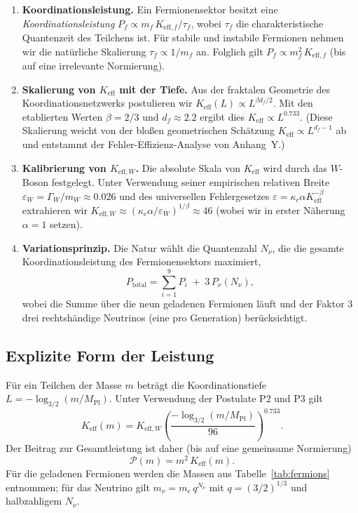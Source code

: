\documentclass[12pt,a4paper]{article}
\begin{document}
	\begin{enumerate}[label=\textbf{P\arabic*}:, leftmargin=*]
		\item \textbf{Koordinationsleistung.} Ein Fermionensektor besitzt eine \emph{Koordinationsleistung} 
		\(P_f \propto m_f \, K_{\mathrm{eff},f}/\tau_f\), wobei \(\tau_f\) die charakteristische Quantenzeit des Teilchens ist.  Für stabile und instabile Fermionen nehmen wir die natürliche Skalierung \(\tau_f \propto 1/m_f\) an.  Folglich gilt \(P_f \propto m_f^2 \, K_{\mathrm{eff},f}\) (bis auf eine irrelevante Normierung).
		\item \textbf{Skalierung von \(K_{\mathrm{eff}}\) mit der Tiefe.} Aus der fraktalen Geometrie des Koordinationsnetzwerks postulieren wir 
		\(K_{\mathrm{eff}}(L) \propto L^{\beta d_f/2}\).  Mit den etablierten Werten \(\beta=2/3\) und \(d_f\approx2.2\) ergibt dies \(K_{\mathrm{eff}} \propto L^{0.733}\).  (Diese Skalierung weicht von der bloßen geometrischen Schätzung \(K_{\mathrm{eff}}\propto L^{d_f-1}\) ab und entstammt der Fehler-Effizienz-Analyse von Anhang~Y.)
		\item \textbf{Kalibrierung von \(K_{\mathrm{eff},W}\).}  Die absolute Skala von \(K_{\mathrm{eff}}\) wird durch das \(W\)-Boson festgelegt.  Unter Verwendung seiner empirischen relativen Breite \(\varepsilon_W = \Gamma_W/m_W \approx 0.026\) und des universellen Fehlergesetzes \(\varepsilon = \kappa_c \alpha K_{\mathrm{eff}}^{-\beta}\) extrahieren wir 
		\(K_{\mathrm{eff},W} \approx (\kappa_c \alpha / \varepsilon_W)^{1/\beta} \approx 46\) (wobei wir in erster Näherung \(\alpha=1\) setzen).
		\item \textbf{Variationsprinzip.}  Die Natur wählt die Quantenzahl \(N_{\nu}\), die die gesamte Koordinationsleistung des Fermionensektors maximiert,
		\begin{equation}
			P_{\mathrm{total}} = \sum_{i=1}^{9} P_i \;+\; 3\,P_{\nu}(N_{\nu}),
		\end{equation}
		wobei die Summe über die neun geladenen Fermionen läuft und der Faktor \(3\) drei rechtshändige Neutrinos (eine pro Generation) berücksichtigt.
	\end{enumerate}
	
	\subsection{Explizite Form der Leistung}
	
	Für ein Teilchen der Masse \(m\) beträgt die Koordinationstiefe 
	\(L = -\log_{3/2}(m/M_{\mathrm{Pl}})\).  Unter Verwendung der Postulate P2 und P3 gilt
	\begin{equation}
		K_{\mathrm{eff}}(m) = K_{\mathrm{eff},W} \left( \frac{-\log_{3/2}(m/M_{\mathrm{Pl}})}{96} \right)^{0.733}.
	\end{equation}
	Der Beitrag zur Gesamtleistung ist daher (bis auf eine gemeinsame Normierung)
	\begin{equation}
		\mathcal{P}(m) = m^2 \, K_{\mathrm{eff}}(m).
	\end{equation}
	Für die geladenen Fermionen werden die Massen aus Tabelle~\ref{tab:fermions} entnommen; für das Neutrino gilt \(m_{\nu} = m_e \, q^{N_{\nu}}\) mit \(q=(3/2)^{1/3}\) und halbzahligem \(N_{\nu}\).
	
\end{document}
